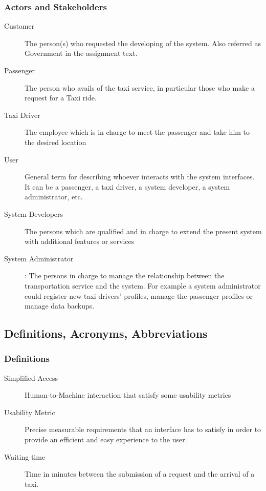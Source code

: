 \documentclass[11pt, a4paper,titlepage]{article}
\begin{document}
\subsubsection{Actors and Stakeholders}
\begin{description}
	\item[Customer] \label{itm:Actor_Customer} The person(s) who requested the developing of the system. Also referred as Government in the assignment text.
	\item[Passenger] \label{itm:Actor_Passenger} The person who avails of the taxi service, in particular those who make a request for a Taxi ride.
	\item[Taxi Driver] \label{itm:Actor_TaxiDriver} The employee which is in charge to meet the passenger and take him to the desired location
	\item[User]\label{itm:Actor_User} General term for describing whoever interacts with the system interfaces. It can be a passenger, a taxi driver, a system developer, a system administrator, etc.
	\item[System Developers] \label{itm:Actor_SysDevs} The persons which are qualified and in charge to extend the present system with additional features or services
	\item[System Administrator] \label{itm:Actor_SysAdmin}: The persons in charge to manage the relationship between the transportation service and the system. For example a system administrator could register new taxi drivers’ profiles, manage the passenger profiles or manage data backups.
\end{description}

\subsection{Definitions, Acronyms, Abbreviations}
\subsubsection{Definitions}
	\begin{description}
		\item[Simplified Access] \label{itm:Desc_SimplifiedAccess} Human-to-Machine interaction that satisfy some usability metrics
		\item[Usability Metric] \label{itm:Desc_UsabilityMetric} Precise measurable requirements that an interface has to satisfy in order to provide an efficient and easy experience to the user.
		\item[Waiting time] \label{itm:Desc_WaitingTime} Time in minutes between the submission of a request and the arrival of a taxi.
	\end{description}
\end{document}
